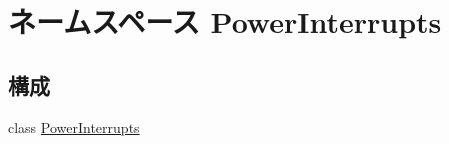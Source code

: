 \hypertarget{namespacePowerInterrupts}{
\section{ネームスペース PowerInterrupts}
\label{namespacePowerInterrupts}
}
\subsection*{構成}
\begin{DoxyCompactItemize}
\item 
class \hyperlink{classPowerInterrupts_1_1PowerInterrupts}{PowerInterrupts}
\end{DoxyCompactItemize}
